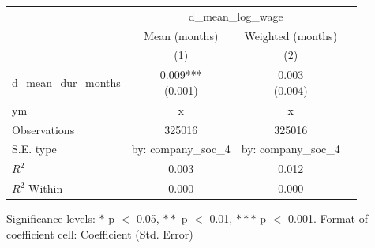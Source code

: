\renewcommand\cellalign{t}
\begin{threeparttable}
\begin{tabular}{lccc}
\toprule
 & \multicolumn{2}{c}{d_mean_log_wage} \\
\cmidrule(lr){2-3} 
 & Mean (months) & Weighted (months) \\
 & (1) & (2) \\
\midrule
\addlinespace
d_mean_dur_months & \makecell{0.009*** \\ (0.001)} & \makecell{0.003 \\ (0.004)} \\
\midrule
\addlinespace
ym & x & x \\
\midrule
\addlinespace
Observations & 325016 & 325016 \\
S.E. type & by: company_soc_4 & by: company_soc_4 \\
$R^2$ & 0.003 & 0.012 \\
$R^2$ Within & 0.000 & 0.000 \\
\bottomrule
\end{tabular}
\footnotesize Significance levels: $*$ p $<$ 0.05, $**$ p $<$ 0.01, $***$ p $<$ 0.001. Format of coefficient cell: Coefficient 
 (Std. Error)
\end{threeparttable}